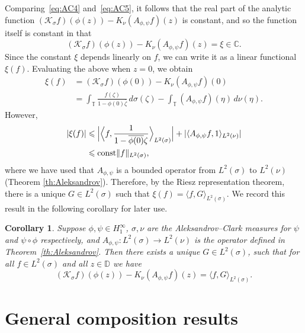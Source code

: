 \documentclass[11pt]{amsart}
\def\<{\langle}
\def\>{\rangle}
\def\C{{\mathbb{C}}}
\def\D{\mathbb{D}}
\def\T{\mathbb{T}}
\def\KK{{\mathcal K}}
\renewcommand{\leq}{\leqslant}
\numberwithin{equation}{section}
\theoremstyle{plain}
\newtheorem{corollary}[equation]{Corollary}
\theoremstyle{definition}
\begin{document}
Comparing~\eqref{eq:AC4} and~\eqref{eq:AC5}, it follows that the real part of the analytic function $(\KK_\sigma f)(\phi(z))-K_{\nu}(A_{\phi, \psi} f)(z) $ is constant, and so the function itself is constant in that 
\begin{equation*}
	(\KK_\sigma f)(\phi(z))-K_\nu (A_{\phi, \psi} f)(z)=\xi\in\C.
\end{equation*}
Since the constant $\xi$ depends linearly on $f$, we can write it as a linear functional $\xi(f)$. 
Evaluating the above when $z = 0$, we obtain 
\[
\begin{split}
\xi(f)&= 	(\KK_\sigma f)(\phi(0))-K_\nu (A_{\phi, \psi} f)(0)\\
&=\int_{\T}\frac{f(\zeta)}{1-\phi(0)\overline{\zeta}}\, d\sigma(\zeta)-\int_{\T}(A_{\phi, \psi} f)(\eta)\,d\nu(\eta).
\end{split}
\]
However, 
\begin{align*}
|\xi(f)| & \leq \Big|\Big\langle f, \frac{1}{1-\overline{\phi(0)} \zeta}\Big\rangle_{L^2(\sigma)}\Big|+|\<A_{\phi, \psi} f, 1\>_{L^2(\nu)}|\\
&\leq \text{\rm const}\| f \|_{L^2(\sigma)},
\end{align*}
where we have used that $ A_{\phi, \psi}  $ is a bounded operator from $ L^2(\sigma) $ to $ L^2(\nu) $ (Theorem \ref{th:Aleksandrov}). Therefore, by the Riesz representation theorem, there is a  unique $G \in L^2(\sigma)$ such that $\xi(f) = \langle f, G\rangle_{L^2(\sigma)}$. We record this result in the following corollary for later use.

\begin{corollary}\label{co:Aleksandrov Cauchy}
Suppose $\phi, \psi\in H^\infty_1$, $\sigma, \nu$ are the Aleksandrov--Clark measures for $\psi$ and $\psi\circ\phi$ respectively, and $A_{\phi,\psi}:L^2(\sigma)\to L^2(\nu)$ is the operator defined in Theorem~\ref{th:Aleksandrov}. Then there exists  a unique $G\in L^2(\sigma)$, such that for all $f \in L^2(\sigma)$ and all $z \in \D$ we have
	\begin{equation}\label{eq:AC6}
		(\KK_\sigma f)(\phi(z))-K_\nu (A_{\phi, \psi} f)(z) =\< f,G \>_{L^2(\sigma)}.
	\end{equation}
\end{corollary}

 

\section{General composition results}\label{GeneralC}
\end{document}
